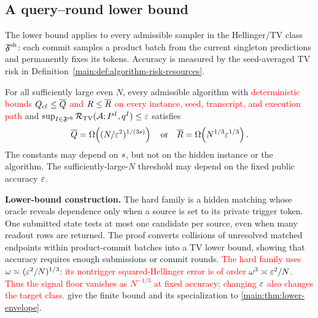 \subsection{A query--round lower bound}
\label{sec:main-lower}

The lower bound applies to every admissible sampler in the Hellinger/TV
class $\mathfrak F^{\mathrm{sh}}$: each commit samples a product batch from the
current singleton predictions and permanently fixes its tokens.
Accuracy is measured by the seed-averaged TV risk in
Definition~\ref{main:def:algorithm-risk-resources}.

\begin{theorem}
\label{main:thm:lower-envelope}
For all sufficiently large even $N$, every admissible algorithm with
\textcolor{red}{deterministic bounds
$Q_{\mathrm{cf}}\le\overline Q$ and $R\le\overline R$
on every instance, seed, transcript, and execution path} and
$\sup_{I\in\mathfrak F^{\mathrm{sh}}}
 \mathcal R_{\mathrm{TV}}(\mathcal A;P^{I},q^{I})
 \le\varepsilon$ satisfies
\begin{equation}
 \overline Q
 =\Omega\!\left(
     (N/\varepsilon^2)^{1/(3s)}
   \right)
 \quad\text{or}\quad
 \overline R
 =\Omega\!\left(
     N^{1/3}\varepsilon^{1/3}
   \right).
 \label{main:eq:canonical-lower}
\end{equation}
The constants may depend on $s$, but not on the hidden
instance or the algorithm. The sufficiently-large-$N$ threshold may
depend on the fixed public accuracy $\varepsilon$.
\end{theorem}

\textbf{Lower-bound construction.}
The hard family is a hidden matching whose oracle reveals dependence
only when a source is set to its private trigger token.
One submitted state tests at most one candidate per source, even when
many readout rows are returned.
The proof converts collisions of unresolved matched endpoints within
product-commit batches into a TV lower bound, showing that accuracy
requires enough submissions or commit rounds.
\textcolor{red}{The hard family uses
$\omega\asymp(\varepsilon^2/N)^{1/3}$: its nontrigger
squared-Hellinger error is of order $\omega^3\asymp\varepsilon^2/N$.
Thus the signal floor vanishes as $N^{-1/3}$ at fixed accuracy;
changing $\varepsilon$ also changes the target class.}
give the finite bound and its specialization to
\cref{main:thm:lower-envelope}.
